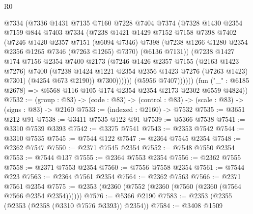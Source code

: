 \begin{lexlean}{R0}
\begin{coremodule}
                    @7334
                    (@7336
                      @1431
                      @7135
                      @7160
                      @7228
                      @7404
                      @7374
                      (@7328
                        @1430
                        @2354
                        @7159
                        @844
                        @7403
                        @7334
                        (@7238
                          @1421
                          @1429
                          @7152
                          @7158
                          @7398
                          @7402
                          (@7246
                            @1420
                            @2357
                            @7151
                            (@6094 @7346)
                            @7398
                            (@7238 @1266 @1280 @2354 @2356 @1265 @7346 (@7263 @1265) @7370)
                            (@6136 @7131))
                          (@7238
                            @1427
                            @174
                            @7156
                            @2354
                            @7400
                            @2173
                            (@7246
                              @1426
                              @2357
                              @7155
                              (@2163 @1423 @7276)
                              @7400
                              (@7238 @1424 @1221 @2354 @2356 @1423 @7276 (@7263 @1423) @7301)
                              (@4254 @673 @2190))
                            @7300))))))
                (@5956 @7407))))))
      (fun ("_" : @6185 @2678) => @6568 @116 @105 @174 @2354 @2354 @2173 @2302 @6559 @4824))
@7532 := (group : @83) -> (code : @83) -> (control : @83) -> (scale : @83) -> (signs : @83) -> @2160
@7533 := (indexed : @2160) -> @7532
@7535 := @3651 @212 @91
@7538 := @3411 @7535 @122 @91
@7539 := @5366 @7538
@7541 := @3310 @7539 @3393
@7542 := @3375 @7541
@7543 := @2353 @7542
@7544 := @3310 @7535
@7545 := @7544 @122
@7547 := @2364 @7545 @2354
@7548 := @2362 @7547
@7550 := @2371 @7545 @2354
@7552 := @7548 @7550 @2354
@7553 := @7544 @137
@7555 := @2364 @7553 @2354
@7556 := @2362 @7555
@7558 := @2371 @7553 @2354
@7560 := @7556 @7558 @2354
@7561 := @7544 @223
@7563 := @2364 @7561 @2354
@7564 := @2362 @7563
@7566 := @2371 @7561 @2354
@7575 := @2353 (@2360 (@7552 (@2360 (@7560 (@2360 (@7564 @7566 @2354 @2354))))))
@7576 := @5366 @2190
@7583 := @2353 (@2355 (@2353 (@2358 (@3310 @7576 @3393)) @2354))
@7584 := @3408 @1509

\end{coremodule}
\end{lexlean}
